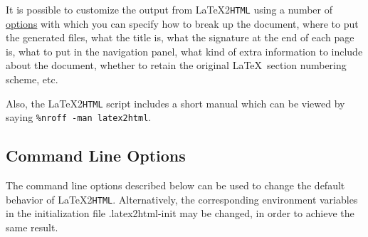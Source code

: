 \documentclass[dvips]{article}
\newcommand{\latextohtml}{\LaTeX 2\texttt{HTML}}
\newcommand{\fn}[1]{{\ttfamily #1}}	%
\begin{document}
It is possible to customize the output from \latextohtml{} using a number
of \hyperref{command line options}{command line options (see Section
}{)}{options}
with which you can specify how to break up the document, where to put 
the generated files, what the title is, what the signature at the end
of each page is, what to put in the navigation panel, what kind of
extra information to include about the document, whether to retain
the original \LaTeX\  section numbering scheme, etc.

Also, the \latextohtml{} script includes a short manual which can be 
viewed by saying \verb|%nroff -man latex2html|.

\subsection{Command Line Options}
\label{options}
The command line options described below can be used to change the
default behavior of \latextohtml. Alternatively, the corresponding 
environment variables
in the initialization file \fn{.latex2html-init} may be changed, in
order to achieve the same result.
\end{document}

